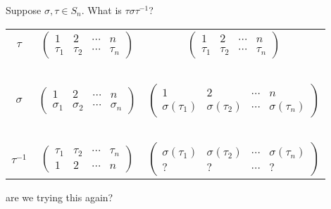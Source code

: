 Suppose $ \sigma, \tau \in S_{n} $. What is $ \tau\sigma\tau^{-1} $?
\begin{center}
    \begin{tabular}{ccc}
        $ \tau $ & $ \begin{pmatrix}
            1 & 2 & \cdots & n \\ \tau_{1} & \tau_{2} & \cdots & \tau_{n}
        \end{pmatrix} $ & $ \begin{pmatrix}
            1 & 2 & \cdots & n \\ \tau_{1} & \tau_{2} & \cdots & \tau_{n}
        \end{pmatrix} $ \\ \ \\
        $ \sigma $ & $ \begin{pmatrix}
            1 & 2 & \cdots & n \\ \sigma_{1} & \sigma_{2} & \cdots & \sigma_{n}
        \end{pmatrix} $ & $ \begin{pmatrix}
        1 & 2 & \cdots & n \\ \sigma(\tau_{1}) & \sigma(\tau_{2}) & \cdots & \sigma(\tau_{n})
        \end{pmatrix} $ \\ \ \\
        $ \tau^{-1} $ & $ \begin{pmatrix}
            \tau_{1} & \tau_{2} & \cdots & \tau_{n} \\ 1 & 2 & \cdots & n
        \end{pmatrix} $ & $ \begin{pmatrix}
        \sigma(\tau_{1}) & \sigma(\tau_{2}) & \cdots & \sigma(\tau_{n}) \\ ? & ? & \cdots & ?
        \end{pmatrix} $
    \end{tabular}
\end{center}


are we trying this again?

